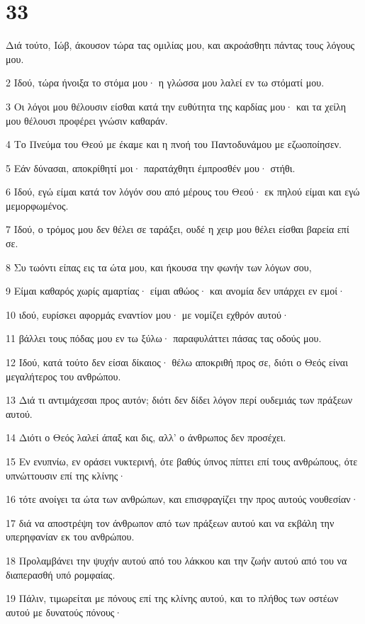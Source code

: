 \chapter{33}

\par Διά τούτο, Ιώβ, άκουσον τώρα τας ομιλίας μου, και ακροάσθητι πάντας τους λόγους μου.
\par 2 Ιδού, τώρα ήνοιξα το στόμα μου· η γλώσσα μου λαλεί εν τω στόματί μου.
\par 3 Οι λόγοι μου θέλουσιν είσθαι κατά την ευθύτητα της καρδίας μου· και τα χείλη μου θέλουσι προφέρει γνώσιν καθαράν.
\par 4 Το Πνεύμα του Θεού με έκαμε και η πνοή του Παντοδυνάμου με εζωοποίησεν.
\par 5 Εάν δύνασαι, αποκρίθητί μοι· παρατάχθητι έμπροσθέν μου· στήθι.
\par 6 Ιδού, εγώ είμαι κατά τον λόγόν σου από μέρους του Θεού· εκ πηλού είμαι και εγώ μεμορφωμένος.
\par 7 Ιδού, ο τρόμος μου δεν θέλει σε ταράξει, ουδέ η χειρ μου θέλει είσθαι βαρεία επί σε.
\par 8 Συ τωόντι είπας εις τα ώτα μου, και ήκουσα την φωνήν των λόγων σου,
\par 9 Είμαι καθαρός χωρίς αμαρτίας· είμαι αθώος· και ανομία δεν υπάρχει εν εμοί·
\par 10 ιδού, ευρίσκει αφορμάς εναντίον μου· με νομίζει εχθρόν αυτού·
\par 11 βάλλει τους πόδας μου εν τω ξύλω· παραφυλάττει πάσας τας οδούς μου.
\par 12 Ιδού, κατά τούτο δεν είσαι δίκαιος· θέλω αποκριθή προς σε, διότι ο Θεός είναι μεγαλήτερος του ανθρώπου.
\par 13 Διά τι αντιμάχεσαι προς αυτόν; διότι δεν δίδει λόγον περί ουδεμιάς των πράξεων αυτού.
\par 14 Διότι ο Θεός λαλεί άπαξ και δις, αλλ' ο άνθρωπος δεν προσέχει.
\par 15 Εν ενυπνίω, εν οράσει νυκτερινή, ότε βαθύς ύπνος πίπτει επί τους ανθρώπους, ότε υπνώττουσιν επί της κλίνης·
\par 16 τότε ανοίγει τα ώτα των ανθρώπων, και επισφραγίζει την προς αυτούς νουθεσίαν·
\par 17 διά να αποστρέψη τον άνθρωπον από των πράξεων αυτού και να εκβάλη την υπερηφανίαν εκ του ανθρώπου.
\par 18 Προλαμβάνει την ψυχήν αυτού από του λάκκου και την ζωήν αυτού από του να διαπερασθή υπό ρομφαίας.
\par 19 Πάλιν, τιμωρείται με πόνους επί της κλίνης αυτού, και το πλήθος των οστέων αυτού με δυνατούς πόνους·
